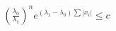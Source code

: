 \documentclass[preview]{standalone}
\begin{document}
\begin{align*}
\left(\frac{\lambda_0}{\lambda_1}\right)^n e^{(\lambda_1-\lambda_0)\sum |x_i|} \leq c
\end{align*}
\end{document}
